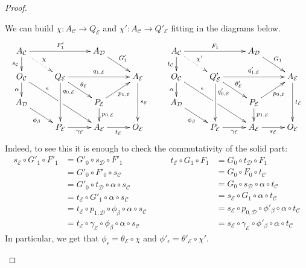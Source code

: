 \documentclass[a4paper,UKenglish,cleveref,pdftex,thm-restate,numberwithinsect]{lipics-v2021}
\begin{document}
\begin{proof}
\begin{enumerate}
				
			We can build $\chi\colon A_{\mathcal{C}}\to Q_{\mathcal{E}}$ and $\chi'\colon A_{\mathcal{C}}\to Q'_{\mathcal{E}}$ fitting in the diagrams below.
\[\xymatrix@C=26pt@R=15pt{  A_{\mathcal{C}} \ar[d]_{s_{\mathcal{C}}} \ar@{.>}[dr]^{\chi}\ar[rr]^{F'_1} & &A_{\mathcal{D}} \ar[dr]^{G'_1} &&A_{\mathcal{C}} \ar[d]_{t_{\mathcal{C}}} \ar@{.>}[dr]^{\chi'}\ar[rr]^{F_1} & &A_{\mathcal{D}} \ar[dr]^{G_1}\\O_{\mathcal{C}} \ar[ddrr]^(.3){\epsilon}|\hole \ar[d]_{\alpha} & Q_{\mathcal{E}} \ar[rr]^{q_{1, \mathcal{E}}}  \ar[dd]^(.3){q_{0, \mathcal{E}}} \ar[dr]^{\theta_{\mathcal{E}}}& & A_{\mathcal{E}} \ar[dd]^{s_{\mathcal{E}}} & O_{\mathcal{C}} \ar[ddrr]^(.3){\epsilon}|\hole \ar[d]_{\alpha} & Q'_{\mathcal{E}} \ar[rr]^{q'_{1, \mathcal{E}}}  \ar[dd]^(.3){q'_{0, \mathcal{E}}} \ar[dr]^{\theta'_{\mathcal{E}}}& & A_{\mathcal{E}} \ar[dd]^{t_{\mathcal{E}}}\\ A_{\mathcal{D}} \ar[dr]_{\phi_{\beta}}  &&  P_{\mathcal{E}} \ar[ur]_{p_{1, \mathcal{E}}} \ar[d]^{p_{0, \mathcal{E}}} && A_{\mathcal{D}} \ar[dr]_{\phi_{\beta}}  &&  P_{\mathcal{E}} \ar[ur]_{p_{0, \mathcal{E}}} \ar[d]^{p_{1, \mathcal{E}}}\\  &P_{\mathcal{E}}\ar[r]_{\gamma_{\mathcal{E}}}& A_{\mathcal{E}} \ar[r]_{t_{\mathcal{E}}} & O_{\mathcal{E}} & & P_{\mathcal{E}}\ar[r]_{\gamma_{\mathcal{E}}}& A_{\mathcal{E}} \ar[r]_{s_{\mathcal{E}}} & O_{\mathcal{E}}}\]			
	Indeed, to see this it is enough to check the commutativity of the solid part:
			\[\begin{split}
				s_{\mathcal{E}}\circ G'_1\circ F'_1 &= G'_0\circ s_{\mathcal{D}}\circ F'_1\\&= G'_0\circ F'_0\circ s_{\mathcal{C}}\\&=G'_0\circ t_{\mathcal{D}}\circ \alpha \circ s_{\mathcal{C}}\\&= t_{\mathcal{E}}\circ G'_1\circ \alpha \circ s_{\mathcal{C}}\\&= t_{\mathcal{E}} \circ p_{1, \mathcal{D}}\circ \phi_\beta\circ \alpha \circ s_{\mathcal{C}}\\&= t_{\mathcal{E}}\circ \gamma_{\mathcal{E}}\circ \phi_\beta\circ \alpha \circ s_{\mathcal{C}}
			\end{split} \qquad \begin{split}
			t_{\mathcal{E}}\circ G_1\circ F_1 &= G_0\circ t_{\mathcal{D}}\circ F_1\\&= G_0\circ F_0\circ t_{\mathcal{C}}\\&=G_0\circ s_{\mathcal{D}}\circ \alpha \circ t_{\mathcal{C}}\\&= s_{\mathcal{E}}\circ G_1\circ \alpha \circ t_{\mathcal{C}}\\&= s_{\mathcal{E}} \circ p_{0, \mathcal{D}}\circ \phi'_\beta\circ \alpha \circ t_{\mathcal{C}}\\&= s_{\mathcal{E}}\circ \gamma_{\mathcal{E}}\circ \phi'_\beta\circ \alpha \circ t_{\mathcal{C}}
			\end{split}\]
	In particular, we get that $\phi_{\epsilon}= \theta_{\mathcal{E}}\circ \chi$ and 
			$\phi'_{\epsilon}= \theta'_{\mathcal{E}}\circ \chi'$.
			

\end{enumerate}
\end{proof}
\end{document}
